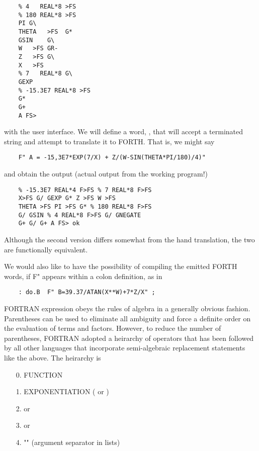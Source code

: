 \begin{lstlisting}
    % 4   REAL*8 >FS
    % 180 REAL*8 >FS
    PI G\
    THETA   >FS  G*
    GSIN    G\
    W   >FS GR-
    Z   >FS G\
    X   >FS
    % 7   REAL*8 G\
    GEXP
    % -15.3E7 REAL*8 >FS
    G*
    G+
    A FS>
\end{lstlisting}

 with the user interface. We will define a word, , that will accept a terminated string and attempt to translate it to FORTH. That is, we might say

\begin{lstlisting}
    F" A = -15,3E7*EXP(7/X) + Z/(W-SIN(THETA*PI/180)/4)"
\end{lstlisting}

and obtain the output (actual output from the working program!)

\begin{lstlisting}
    % -15.3E7 REAL*4 F>FS % 7 REAL*8 F>FS
    X>FS G/ GEXP G* Z >FS W >FS
    THETA >FS PI >FS G* % 180 REAL*8 F>FS
    G/ GSIN % 4 REAL*8 F>FS G/ GNEGATE
    G+ G/ G+ A FS> ok
\end{lstlisting}

Although the second version differs somewhat from the hand translation, the two are functionally equivalent.

We would also like to have the possibility of compiling the emitted FORTH words, if F" appears within a colon definition, as in

\begin{lstlisting}
    : do.B  F" B=39.37/ATAN(X**W)+7*Z/X" ;
\end{lstlisting}

 FORTRAN expression obeys the rules of algebra in a generally obvious fashion. Parentheses can be used to eliminate all ambiguity and force a definite order on the evaluation of terms and factors. However, to reduce the number of parentheses, FORTRAN adopted a heirarchy of operators that has been followed by all other languages that incorporate semi-algebraic replacement statements like the above. The heirarchy is

\begin{enumerate}
    \item[0.] FUNCTION
    \item[1.] EXPONENTIATION ( \bc{^} or \bc{**})
    \item[2.] \bc{*} or \bc{/}
    \item[3.] \bc{+} or \bc{-}
    \item[4.] "\bc{,}" (argument separator in lists)
\end{enumerate}

